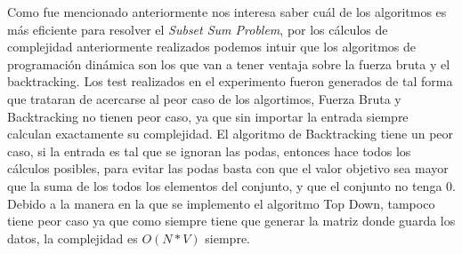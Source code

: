 \documentclass[a4paper]{article}
\begin{document}
Como fue mencionado anteriormente nos interesa saber cuál de los algoritmos es más eficiente para resolver el \textit{Subset Sum Problem}, por los cálculos de complejidad anteriormente realizados podemos intuir que los algoritmos de programación dinámica son los que van a tener ventaja sobre la fuerza bruta y el backtracking. Los test realizados en el experimento fueron generados de tal forma que trataran de acercarse al peor caso de los algortimos, Fuerza Bruta y Backtracking no tienen peor caso, ya que sin importar la entrada siempre calculan exactamente su complejidad. El algoritmo de Backtracking tiene un peor caso, si la entrada es tal que se ignoran las podas, entonces hace todos los cálculos posibles, para evitar las podas basta con que el valor objetivo sea mayor que la suma de los todos los elementos del conjunto, y que el conjunto no tenga 0. Debido a la manera en la que se implemento el algoritmo Top Down, tampoco tiene peor caso ya que como siempre tiene que generar la matriz donde guarda los datos, la complejidad es $O(N*V)$ siempre.
\\
\end{document}
